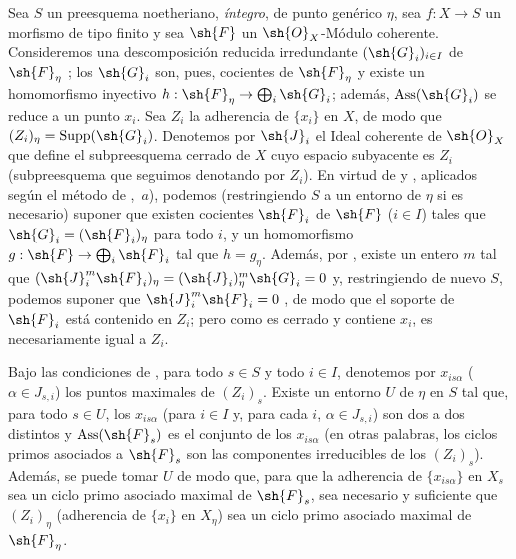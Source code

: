 \medskip
\noindent
\emph{}
\label{IV.9.8.2}
Sea $S$ un preesquema noetheriano, \emph{íntegro}, de punto genérico $\eta$, sea $f:X\to S$ un morfismo de tipo finito y sea $\sh{F}$ un $\sh{O}_X$-Módulo coherente.
Consideremos una descomposición reducida irredundante $(\sh{G}_i)_{i\in I}$ de $\sh{F}_\eta$ ; los $\sh{G}_i$ son, pues, cocientes de $\sh{F}_\eta$ y existe un homomorfismo inyectivo $h:\sh{F}_\eta\to\bigoplus_i\sh{G}_i$; además, $\operatorname{Ass}(\sh{G}_i)$ se reduce a un punto $x_i$.
Sea $Z_i$ la adherencia de $\{x_i\}$ en $X$, de modo que $(Z_i)_\eta=\operatorname{Supp}(\sh{G}_i)$.
Denotemos por $\sh{J}_i$ el Ideal coherente de $\sh{O}_X$ que define el subpreesquema cerrado de $X$ cuyo espacio subyacente es $Z_i$ (subpreesquema que seguimos denotando por $Z_i$).
En virtud de  y , aplicados según el método de ,~$a$), podemos (restringiendo $S$ a un entorno de $\eta$ si es necesario) suponer que existen cocientes $\sh{F}_i$ de $\sh{F}$ ($i\in I$) tales que $\sh{G}_i=(\sh{F}_i)_\eta$ para todo $i$, y un homomorfismo $g:\sh{F}\to\bigoplus_i\sh{F}_i$ tal que $h=g_\eta$.
Además, por , existe un entero $m$ tal que $(\sh{J}_i^m\sh{F}_i)_\eta=(\sh{J}_i)_\eta^m\sh{G}_i=0$ y, restringiendo de nuevo $S$, podemos suponer que $\sh{J}_i^m\sh{F}_i=0$ , de modo que el soporte de $\sh{F}_i$ está contenido en $Z_i$; pero como es cerrado y contiene $x_i$, es necesariamente igual a $Z_i$.

\begin{proposition}[9.8.3]
\label{IV.9.8.3}
Bajo las condiciones de \emph{}, para todo $s\in S$ y todo $i\in I$, denotemos por $x_{is\alpha}$ \textup{(}$\alpha\in J_{s,i}$\textup{)} los puntos maximales de $(Z_i)_s$.
Existe un entorno $U$ de $\eta$ en $S$ tal que, para todo $s\in U$, los $x_{is\alpha}$ (para $i\in I$ y, para cada $i$, $\alpha\in J_{s,i}$) son dos a dos distintos y $\operatorname{Ass}(\sh{F}_s)$ es el conjunto de los $x_{is\alpha}$ (en otras palabras, los ciclos primos asociados a $\sh{F}_s$ son las componentes irreducibles de los $(Z_i)_s$).
Además, se puede tomar $U$ de modo que, para que la adherencia de $\{x_{is\alpha}\}$ en $X_s$ sea un ciclo primo asociado maximal de $\sh{F}_s$, sea necesario y suficiente que $(Z_i)_\eta$ (adherencia de $\{x_i\}$ en $X_\eta$) sea un ciclo primo asociado maximal de $\sh{F}_\eta$.
\end{proposition}

